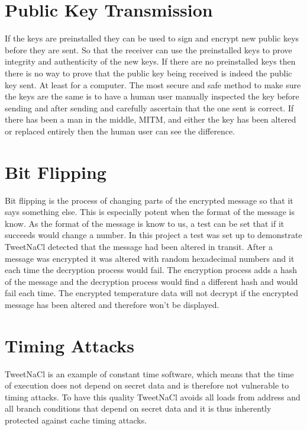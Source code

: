 \section{Public Key Transmission}

If the keys are preinstalled they can be used to sign and encrypt new public keys before they are sent. So that the receiver can use the preinstalled keys to prove integrity and authenticity of the new keys. If there are no preinstalled keys then there is no way to prove that the public key being received is indeed the public key sent. At least for a computer. The most secure and safe method to make sure the keys are the same is to have a human user manually inspected the key before sending and after sending and carefully ascertain that the one sent is correct. If there has been a man in the middle, MITM, and either the key has been altered or replaced entirely then the human user can see the difference. 

\section{Bit Flipping}

Bit flipping is the process of changing parts of the encrypted message so that it says something else. This is especially potent when the format of the message is know. As the format of the message is know to us, a test can be set that if it succeeds would change a number. In this project a test was set up to demonstrate TweetNaCl detected that the message had been altered in transit. After a message was encrypted it was altered with random hexadecimal numbers and it each time the decryption process would fail. The encryption process adds a hash of the message and the decryption process would find a different hash and would fail each time. The encrypted temperature data will not decrypt if the encrypted message has been altered and therefore won't be displayed.

\section{Timing Attacks}

TweetNaCl is an example of constant time software, which means that the time of execution does not depend on secret data and is therefore not vulnerable to timing attacks. To have this quality TweetNaCl avoids all loads from address and all branch conditions that depend on secret data and it is thus inherently protected against cache timing attacks. 

